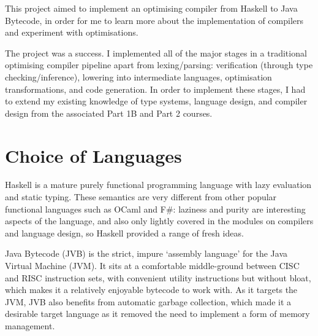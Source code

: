 \documentclass[dissertation.tex]{subfiles}
\begin{document}
This project aimed to implement an optimising compiler from Haskell to Java Bytecode, in order for me to learn more
about the implementation of compilers and experiment with optimisations.


The project was a success. I implemented all of the major stages in a traditional optimising compiler pipeline apart
from lexing/parsing: verification (through type checking/inference), lowering into intermediate languages, optimisation
transformations, and code generation. In order to implement these stages, I had to extend my existing knowledge of type
systems, language design, and compiler design from the associated Part 1B and Part 2 courses.

\section{Choice of Languages}
{

    Haskell is a mature purely functional programming language with lazy evaluation and static typing. These semantics
    are very different from other popular functional languages such as OCaml and F\#: laziness and purity are
    interesting aspects of the language, and also only lightly covered in the modules on compilers and language design,
    so Haskell provided a range of fresh ideas.

    Java Bytecode (JVB) is the strict, impure `assembly language' for the Java Virtual Machine (JVM). It sits at a
    comfortable middle-ground between CISC and RISC instruction sets, with convenient utility instructions but without
    bloat, which makes it a relatively enjoyable bytecode to work with. As it targets the JVM, JVB also benefits from
    automatic garbage collection, which made it a desirable target language as it removed the need to implement a form
    of memory management.

}
\end{document}
